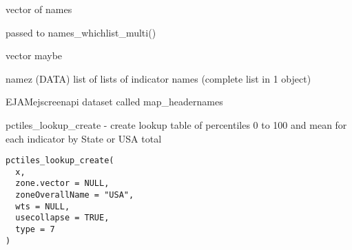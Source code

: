 \documentclass[a4paper]{book}
\begin{document}
%
\begin{Arguments}
\begin{ldescription}
\item[\code{x}] vector of names

\item[\code{...}] passed to names\_whichlist\_multi()
\end{ldescription}
\end{Arguments}
%
\begin{Value}
vector maybe
\end{Value}
%
\begin{Description}\relax
namez (DATA) list of lists of indicator names (complete list in 1 object)
\end{Description}
%
\begin{SeeAlso}\relax
EJAMejscreenapi dataset called map\_headernames  
\end{SeeAlso}
%
\begin{Description}\relax
pctiles\_lookup\_create - create lookup table of percentiles 0 to 100 and mean for each indicator by State or USA total
\end{Description}
%
\begin{Usage}
\begin{verbatim}
pctiles_lookup_create(
  x,
  zone.vector = NULL,
  zoneOverallName = "USA",
  wts = NULL,
  usecollapse = TRUE,
  type = 7
)
\end{verbatim}
\end{Usage}
%
\end{document}

